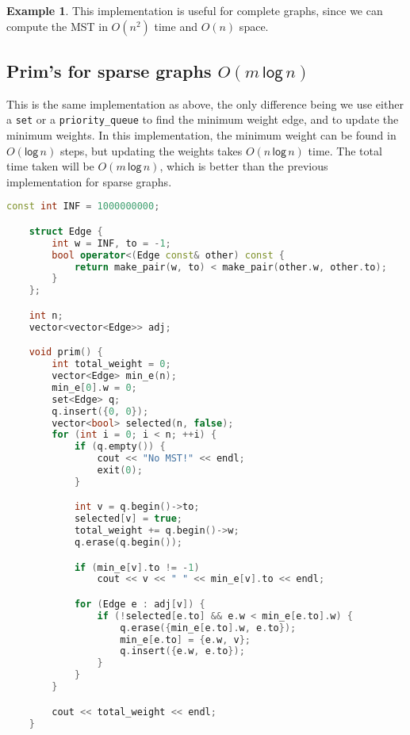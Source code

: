 \documentclass[12pt,a4paper]{amsart}
\numberwithin{equation}{section}
\theoremstyle{definition}
\newtheorem{Ex}{Example}[section]
\begin{document}
\begin{Ex}
    This implementation is useful for complete graphs, since we can compute the MST in $O(n^2)$ time and $O(n)$ space.
\end{Ex}

\subsection{Prim's for sparse graphs $O(m\,\mathsf{log\,}n)$} This is the same implementation as above, the only difference being we use either a \verb|set| or a \verb|priority_queue| to find the minimum weight edge, and to update the minimum weights. In this implementation, the minimum weight can be found in $O(\mathsf{log\,}n)$ steps, but updating the weights takes $O(n\,\mathsf{log\,}n)$ time. The total time taken will be $O(m\mathsf{\,log\,}n)$, which is better than the previous implementation for sparse graphs. 

\begin{lstlisting}[language=C++]
    const int INF = 1000000000;

    struct Edge {
        int w = INF, to = -1;
        bool operator<(Edge const& other) const {
            return make_pair(w, to) < make_pair(other.w, other.to);
        }
    };

    int n;
    vector<vector<Edge>> adj;

    void prim() {
        int total_weight = 0;
        vector<Edge> min_e(n);
        min_e[0].w = 0;
        set<Edge> q;
        q.insert({0, 0});
        vector<bool> selected(n, false);
        for (int i = 0; i < n; ++i) {
            if (q.empty()) {
                cout << "No MST!" << endl;
                exit(0);
            }

            int v = q.begin()->to;
            selected[v] = true;
            total_weight += q.begin()->w;
            q.erase(q.begin());

            if (min_e[v].to != -1)
                cout << v << " " << min_e[v].to << endl;

            for (Edge e : adj[v]) {
                if (!selected[e.to] && e.w < min_e[e.to].w) {
                    q.erase({min_e[e.to].w, e.to});
                    min_e[e.to] = {e.w, v};
                    q.insert({e.w, e.to});
                }
            }
        }

        cout << total_weight << endl;
    }
\end{lstlisting}
\end{document}
